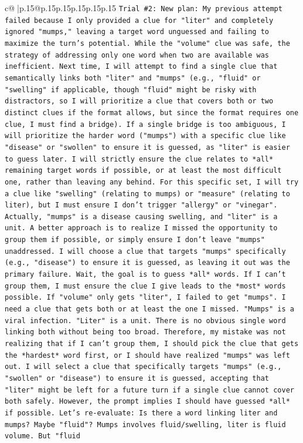 \documentclass{article}
\begin{document}
{\begin{supertabular}{c@{$\;$}|p{.15\linewidth}@{}p{.15\linewidth}p{.15\linewidth}p{.15\linewidth}p{.15\linewidth}p{.15\linewidth}}
{{{\texttt{Trial \#2: New plan: My previous attempt failed because I only provided a clue for "liter" and completely ignored "mumps," leaving a target word unguessed and failing to maximize the turn's potential. While the "volume" clue was safe, the strategy of addressing only one word when two are available was inefficient. Next time, I will attempt to find a single clue that semantically links both "liter" and "mumps" (e.g., "fluid" or "swelling" if applicable, though "fluid" might be risky with distractors, so I will prioritize a clue that covers both or two distinct clues if the format allows, but since the format requires one clue, I must find a bridge). If a single bridge is too ambiguous, I will prioritize the harder word ("mumps") with a specific clue like "disease" or "swollen" to ensure it is guessed, as "liter" is easier to guess later. I will strictly ensure the clue relates to *all* remaining target words if possible, or at least the most difficult one, rather than leaving any behind. For this specific set, I will try a clue like "swelling" (relating to mumps) or "measure" (relating to liter), but I must ensure I don't trigger "allergy" or "vinegar". Actually, "mumps" is a disease causing swelling, and "liter" is a unit. A better approach is to realize I missed the opportunity to group them if possible, or simply ensure I don't leave "mumps" unaddressed. I will choose a clue that targets "mumps" specifically (e.g., "disease") to ensure it is guessed, as leaving it out was the primary failure. Wait, the goal is to guess *all* words. If I can't group them, I must ensure the clue I give leads to the *most* words possible. If "volume" only gets "liter", I failed to get "mumps". I need a clue that gets both or at least the one I missed. "Mumps" is a viral infection. "Liter" is a unit. There is no obvious single word linking both without being too broad. Therefore, my mistake was not realizing that if I can't group them, I should pick the clue that gets the *hardest* word first, or I should have realized "mumps" was left out. I will select a clue that specifically targets "mumps" (e.g., "swollen" or "disease") to ensure it is guessed, accepting that "liter" might be left for a future turn if a single clue cannot cover both safely. However, the prompt implies I should have guessed *all* if possible. Let's re{-}evaluate: Is there a word linking liter and mumps? Maybe "fluid"? Mumps involves fluid/swelling, liter is fluid volume. But "fluid} \\
\\ 
\\ 
}}}
\end{supertabular}}
\end{document}
